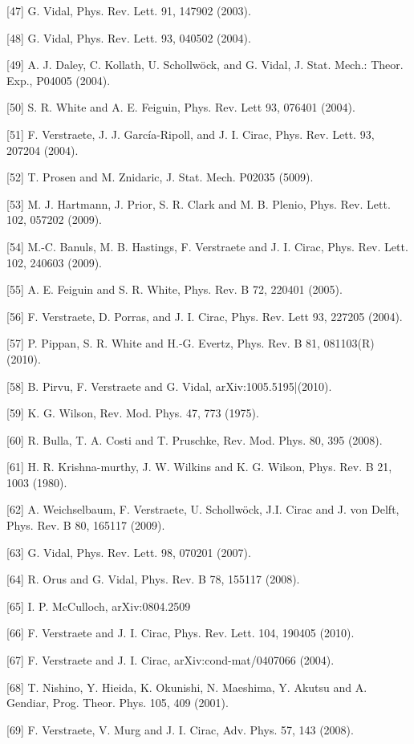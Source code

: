 \documentclass[12pt]{article}
\begin{document}
[47] G. Vidal, Phys. Rev. Lett. 91, 147902 (2003).

[48] G. Vidal, Phys. Rev. Lett. 93, 040502 (2004).

[49] A. J. Daley, C. Kollath, U. Schollwöck, and G. Vidal, J. Stat. Mech.: Theor. Exp., P04005 (2004).

[50] S. R. White and A. E. Feiguin, Phys. Rev. Lett 93, 076401 (2004).

[51] F. Verstraete, J. J. García-Ripoll, and J. I. Cirac, Phys. Rev. Lett. 93, 207204 (2004).

[52] T. Prosen and M. Znidaric, J. Stat. Mech. P02035 (5009).

[53] M. J. Hartmann, J. Prior, S. R. Clark and M. B. Plenio, Phys. Rev. Lett. 102, 057202 (2009).

[54] M.-C. Banuls, M. B. Hastings, F. Verstraete and J. I. Cirac, Phys. Rev. Lett. 102, 240603 (2009).

[55] A. E. Feiguin and S. R. White, Phys. Rev. B 72, 220401 (2005).

[56] F. Verstraete, D. Porras, and J. I. Cirac, Phys. Rev. Lett 93, 227205 (2004).

[57] P. Pippan, S. R. White and H.-G. Evertz, Phys. Rev. B 81, 081103(R) (2010).

[58] B. Pirvu, F. Verstraete and G. Vidal, arXiv:1005.5195|(2010).

[59] K. G. Wilson, Rev. Mod. Phys. 47, 773 (1975).

[60] R. Bulla, T. A. Costi and T. Pruschke, Rev. Mod. Phys. 80, 395 (2008).

[61] H. R. Krishna-murthy, J. W. Wilkins and K. G. Wilson, Phys. Rev. B 21, 1003 (1980).

[62] A. Weichselbaum, F. Verstraete, U. Schollwöck, J.I. Cirac and J. von Delft, Phys. Rev. B 80, 165117 (2009).

[63] G. Vidal, Phys. Rev. Lett. 98, 070201 (2007).

[64] R. Orus and G. Vidal, Phys. Rev. B 78, 155117 (2008).

[65] I. P. McCulloch, arXiv:0804.2509

[66] F. Verstraete and J. I. Cirac, Phys. Rev. Lett. 104, 190405 (2010).

[67] F. Verstraete and J. I. Cirac, arXiv:cond-mat/0407066 (2004).

[68] T. Nishino, Y. Hieida, K. Okunishi, N. Maeshima, Y. Akutsu and A. Gendiar, Prog. Theor. Phys. 105, 409 (2001).

[69] F. Verstraete, V. Murg and J. I. Cirac, Adv. Phys. 57, 143 (2008).
\end{document}
